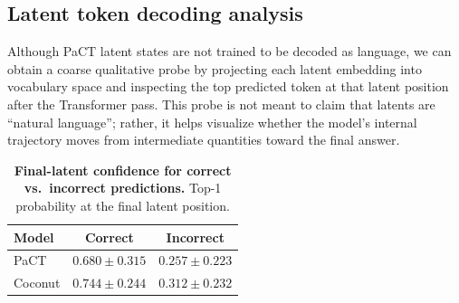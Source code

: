 \subsection{Latent token decoding analysis}
\label{sec:latent_decoding}

Although PaCT latent states are not trained to be decoded as language, we can obtain a coarse qualitative probe by
projecting each latent embedding into vocabulary space and inspecting the top predicted token at that latent position
after the Transformer pass. This probe is not meant to claim that latents are ``natural language''; rather, it helps
visualize whether the model’s internal trajectory moves from intermediate quantities toward the final answer.

\begin{table}[t]
\centering
\small
\caption{\textbf{Final-latent confidence for correct vs.\ incorrect predictions.} Top-1 probability at the final latent
position.}
\label{tab:latent_confidence}
\begin{tabular}{lcc}
\toprule
Model & Correct & Incorrect \\
\midrule
PaCT    & $0.680 \pm 0.315$ & $0.257 \pm 0.223$ \\
Coconut & $0.744 \pm 0.244$ & $0.312 \pm 0.232$ \\
\bottomrule
\end{tabular}
\vspace{-5mm}
\end{table}

